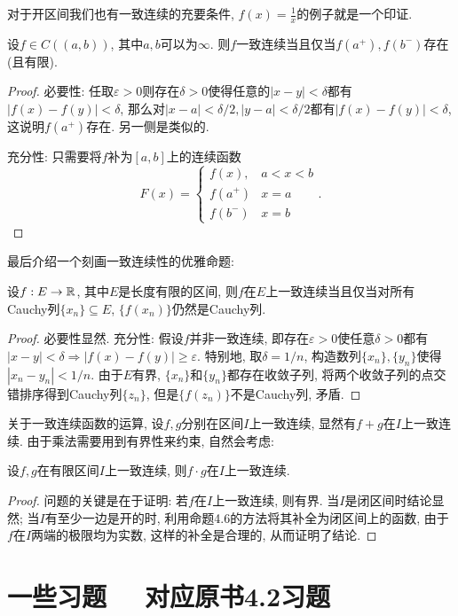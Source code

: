 对于开区间我们也有一致连续的充要条件, $f(x)=\frac{1}{x}$的例子就是一个印证. 

\begin{proposition}{}
	设$f \in C((a,b))$, 其中$a,b$可以为$\infty$. 则$f$一致连续当且仅当$f(a^+),f(b^-)$存在(且有限). 
\end{proposition}
\begin{proof}
	必要性: 任取$\varepsilon >0$则存在$\delta >0$使得任意的$|x-y|<\delta$都有$|f(x)-f(y)|<\delta$, 那么对$|x-a|<\delta /2, |y-a|<\delta /2$都有$|f(x)-f(y)|<\delta$, 这说明$f(a^+)$存在. 另一侧是类似的. 
	
	充分性: 只需要将$f$补为$[a,b]$上的连续函数$$F(x)=\begin{cases}
 f(x), & a<x<b \\
 f(a^+) & x=a \\
 f(b^-) & x=b
\end{cases}.$$
\end{proof}

最后介绍一个刻画一致连续性的优雅命题: 

\begin{proposition}{}
	设$f:E \to \mathbb{R}$, 其中$E$是长度有限的区间, 则$f$在$E$上一致连续当且仅当对所有Cauchy列$\{ x_n \} \subseteq E$, $\{ f(x_n) \}$仍然是Cauchy列. 
\end{proposition}
\begin{proof}
	必要性显然. 充分性: 假设$f$并非一致连续, 即存在$\varepsilon >0$使任意$\delta >0$都有$|x-y|<\delta \Rightarrow |f(x)-f(y)| \geq \varepsilon$. 特别地, 取$\delta = 1/n$, 构造数列$\{ x_n \},\{ y_n \}$使得$|x_n-y_n|<1/n$. 由于$E$有界, $\{ x_n \}$和$\{ y_n \}$都存在收敛子列, 将两个收敛子列的点交错排序得到Cauchy列$\{ z_n \}$, 但是$\{ f(z_n) \}$不是Cauchy列, 矛盾. 
\end{proof}

关于一致连续函数的运算, 设$f,g$分别在区间$I$上一致连续, 显然有$f+g$在$I$上一致连续. 由于乘法需要用到有界性来约束, 自然会考虑: 

\begin{proposition}{}
	设$f,g$在有限区间$I$上一致连续, 则$f \cdot g$在$I$上一致连续. 
\end{proposition}
\begin{proof}
	问题的关键是在于证明: 若$f$在$I$上一致连续, 则有界. 当$I$是闭区间时结论显然; 当$I$有至少一边是开的时, 利用命题4.6的方法将其补全为闭区间上的函数, 由于$f$在$I$两端的极限均为实数, 这样的补全是合理的, 从而证明了结论. 
\end{proof}

\newpage
\section*{一些习题 ~~\small 对应原书4.2习题}
















